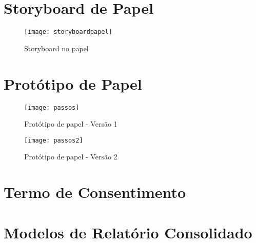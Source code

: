 \begin{apendicesenv}

\partapendices
\chapter{Storyboard de Papel}

\begin{figure}[!htb]
 \centering
 \texttt{[image: storyboardpapel]}
 \caption{Storyboard no papel}
 \label{Rotulo}

\end{figure}

\chapter{Protótipo de Papel}

\begin{figure}[!htb]
 \centering
 \texttt{[image: passos]}
 \caption{Protótipo de papel - Versão 1}
 \label{Rotulo}

\end{figure}

\begin{figure}[!htb]
 \centering
 \texttt{[image: passos2]}
 \caption{Protótipo de papel - Versão 2}
 \label{Rotulo}

\end{figure}

\chapter{Termo de Consentimento}

  

\chapter{Modelos de Relatório Consolidado}

  
  

  \end{apendicesenv}
